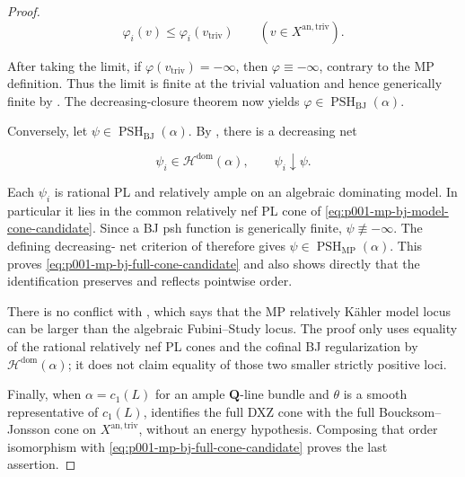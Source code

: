 \begin{proof}
\[
                  \varphi_i(v)\leq\varphi_i(v_{\mathrm{triv}})
                  \qquad(v\in X^{\mathrm{an,triv}}).
\]

After taking the limit, if
\(\varphi(v_{\mathrm{triv}})=-\infty\), then
\(\varphi\equiv-\infty\), contrary to the MP definition.  Thus the limit
is finite at the trivial valuation and hence generically finite by
\cite[Lemma~1.4(ii)]{BJ22}.  The
decreasing-closure theorem
\cite[Theorem~4.5]{BJ22} now yields
\(\varphi\in\operatorname{PSH}_{\mathrm{BJ}}(\alpha)\).

Conversely, let
\(\psi\in\operatorname{PSH}_{\mathrm{BJ}}(\alpha)\).  By
\cite[Theorem~4.15(iii)]{BJ22}, there is a decreasing net

\[
                 \psi_i\in\mathcal H^{\mathrm{dom}}(\alpha),
                 \qquad \psi_i\downarrow\psi.
\]

Each \(\psi_i\) is rational PL and relatively ample on an algebraic
dominating model.  In particular it lies in the common relatively nef PL
cone of
\eqref{eq:p001-mp-bj-model-cone-candidate}.  Since a BJ psh function is
generically finite, \(\psi\not\equiv-\infty\).  The defining decreasing-
net criterion of
\cite[Definition~4.3.1]{MP24} therefore gives
\(\psi\in\operatorname{PSH}_{\mathrm{MP}}(\alpha)\).  This proves
\eqref{eq:p001-mp-bj-full-cone-candidate} and also shows directly that the
identification preserves and reflects pointwise order.

There is no conflict with
\cite[Remark~4.1.3]{MP24}, which says that the MP relatively Kähler model
locus can be larger than the algebraic Fubini--Study locus.  The proof only
uses equality of the rational relatively nef PL cones and the cofinal BJ
regularization by \(\mathcal H^{\mathrm{dom}}(\alpha)\); it does not claim
equality of those two smaller strictly positive loci.

Finally, when \(\alpha=c_1(L)\) for an ample \(\mathbf Q\)-line bundle
and \(\theta\) is a smooth representative of \(c_1(L)\),
\cite[Theorem~3.14]{DXZ23} identifies the full DXZ cone with the full
Boucksom--Jonsson cone on \(X^{\mathrm{an,triv}}\), without an energy
hypothesis.  Composing that order isomorphism with
\eqref{eq:p001-mp-bj-full-cone-candidate} proves the last assertion.
\end{proof}
